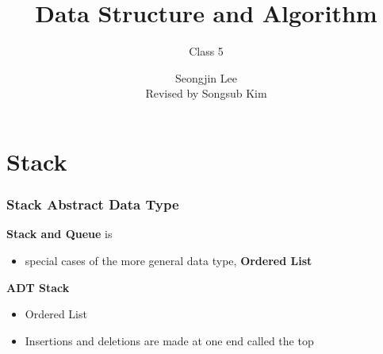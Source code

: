\documentclass[newPxFont,sthlmFooter,nooffset]{beamer}
\title{Data Structure and Algorithm}
\subtitle{Class 5}
\author[SJL]{Seongjin Lee\\{\scriptsize Revised by Songsub Kim}}
\institute{\href{mailto:insight@gnu.ac.kr}{insight@gnu.ac.kr}\\\url{http://resourceful.github.io}\\Systems Research Lab.\\GNU}
\date{}
\begin{document}
\frame[plain,t]{\titlepage} 



\section{Stack} 
\begin{frame}[t]
  \frametitle{Stack Abstract Data Type}
\textbf{Stack and Queue} is
\begin{itemize}
\item special cases of the more general data type, \textbf{Ordered List}
\end{itemize}

\textbf{ADT Stack}
\begin{itemize}
\item Ordered List
\item Insertions and deletions are made at one end called the top
\end{itemize}
\end{frame}
\end{document}
